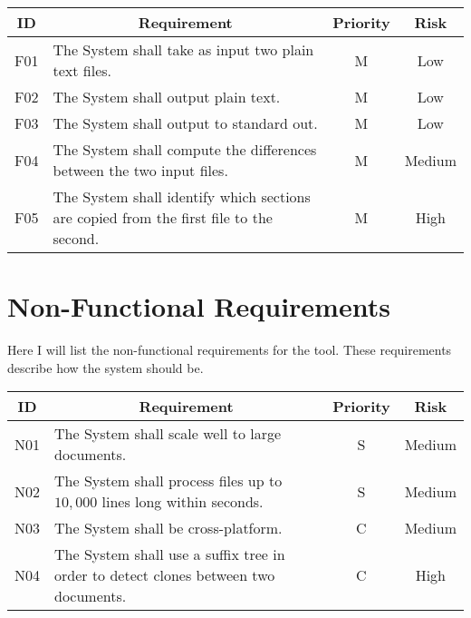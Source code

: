 \begin{center}
\begin{longtable}{c p{2.8in} c c }

	\toprule
	\textbf{ID} & \multicolumn{1}{c}{\textbf{Requirement}} & \textbf{Priority} & \textbf{Risk} \\
	\midrule
	
	F01 & The System shall take as input two plain text files. & M & Low \\
	F02 & The System shall output plain text. & M & Low \\
	F03 & The System shall output to standard out. & M & Low \\
	F04 & The System shall compute the differences between the two input files. & M & Medium \\
	F05 & The System shall identify which sections are copied from the first file to the second. & M & High \\

\bottomrule        
\end{longtable}
\end{center}

\section{Non-Functional Requirements}

Here I will list the non-functional requirements for the tool.
These requirements describe how the system should be.

\begin{center}
\begin{longtable}{c p{2.8in} c c }

	\toprule
	\textbf{ID} & \multicolumn{1}{c}{\textbf{Requirement}} & \textbf{Priority} & \textbf{Risk} \\
	\midrule
	
	N01 & The System shall scale well to large documents. & S & Medium \\
	N02 & The System shall process files up to $10,000$ lines long within seconds. & S & Medium \\
	N03 & The System shall be cross-platform. & C & Medium \\
	N04 & The System shall use a suffix tree in order to detect clones between two documents. & C & High \\
	
\bottomrule
\end{longtable}
\end{center}
